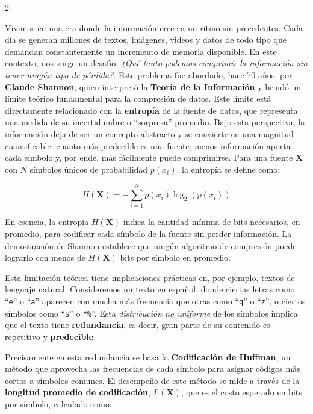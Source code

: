 \documentclass[a4paper, 10pt]{article}
\begin{document}
    \begin{multicols}{2}

    Vivimos en una era donde la información crece a un ritmo sin precedentes. Cada día se generan millones de textos, imágenes, videos y datos de todo tipo que demandan constantemente un incremento de memoria disponible. En este contexto, nos surge un desafío: \textit{¿Qué tanto podemos comprimir la información sin tener ningún tipo de pérdida?}.  Este problema fue abordado, hace 70 años, por \textbf{Claude Shannon}, quien interpretó la \textbf{Teoría de la Información} y brindó un límite teórico fundamental para la compresión de datos. Este límite está directamente relacionado con la \textbf{entropía} de la fuente de datos, que representa una medida de su incertidumbre o ``sorpresa'' promedio. Bajo esta perspectiva, la información deja de ser un concepto abstracto y se convierte en una magnitud cuantificable: cuanto más predecible es una fuente, menos información aporta cada símbolo y, por ende, más fácilmente puede comprimirse. Para una fuente $\mathbf{X}$ con $N$ símbolos únicos de probabilidad $p(x_i)$, la entropía se define como:

    \begin{equation}
        H(\mathbf{X}) = -\sum_{i=1}^{N}p(x_i)\log_2(p(x_i))
        \label{eq:entropy}
    \end{equation}

    En esencia, la entropía $H(\mathbf{X})$ indica la cantidad mínima de bits necesarios, en promedio, para codificar cada símbolo de la fuente sin perder información. La demostración de Shannon establece que ningún algoritmo de compresión puede lograrlo con menos de $H(\mathbf{X})$ bits por símbolo en promedio.

    Esta limitación teórica tiene implicaciones prácticas en, por ejemplo, textos de lenguaje natural. Consideremos un texto en español, donde ciertas letras como ``\texttt{e}'' o ``\texttt{a}'' aparecen con mucha más frecuencia que otras como ``\texttt{q}'' o ``\texttt{z}'', o ciertos símbolos como ``\texttt{\$}'' o ``\texttt{\%}''. Esta \textit{distribución no uniforme} de los símbolos implica que el texto tiene \textbf{redundancia}, es decir, gran parte de su contenido es repetitivo y \textbf{predecible}.

    Precisamente en esta redundancia se basa la \textbf{Codificación de Huffman}, un método que aprovecha las frecuencias de cada símbolo para asignar códigos más cortos a símbolos comunes. El desempeño de este método se mide a través de la \textbf{longitud promedio de codificación}, $L(\mathbf{X})$, que es el costo esperado en bits por símbolo, calculado como:


\end{multicols}
\end{document}
